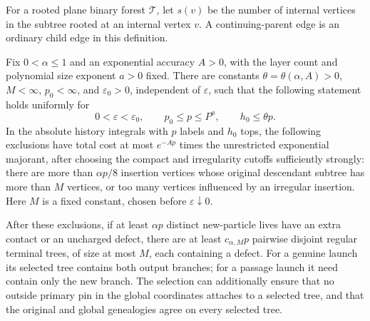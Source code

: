 For a rooted plane binary forest $\mathcal T$, let $s(v)$ be the number of
internal vertices in the subtree rooted at an internal vertex $v$.  A
continuing-parent edge is an ordinary child edge in this definition.

\begin{lemma}
\label{exp:terminal}
Fix $0<\alpha\le1$ and an exponential accuracy $A>0$, with the layer
count and polynomial size exponent $a>0$ fixed.  There are constants
$\theta=\theta(\alpha,A)>0$, $M<\infty$, $p_0<\infty$, and
$\varepsilon_0>0$, independent of $\varepsilon$, such that the following
statement holds uniformly for
\[
 0<\varepsilon<\varepsilon_0,\qquad p_0\le p\le P^a,\qquad h_0\le\theta p.
\]
In the absolute history integrals with $p$ labels and $h_0$ tops, the
following exclusions have total cost at most $e^{-Ap}$ times the
unrestricted exponential majorant, after choosing the compact and
irregularity cutoffs sufficiently strongly:
there are more than $\alpha p/8$ insertion vertices whose original descendant
subtree has more than $M$ vertices, or too many vertices influenced by an
irregular insertion.  Here $M$ is a fixed constant, chosen before
$\varepsilon\downarrow0$.

After these exclusions, if at least $\alpha p$ distinct new-particle lives
have an extra contact or an uncharged defect, there are at least $c_{\alpha,M}p$ pairwise disjoint
regular terminal trees, of size at most $M$, each containing a defect.  For a
genuine launch its selected tree contains both output branches; for a
passage launch it need contain only the new branch.  The selection can
additionally ensure that no outside primary pin in the global coordinates
attaches to a selected tree, and that the original and global genealogies
agree on every selected tree.
\end{lemma}


